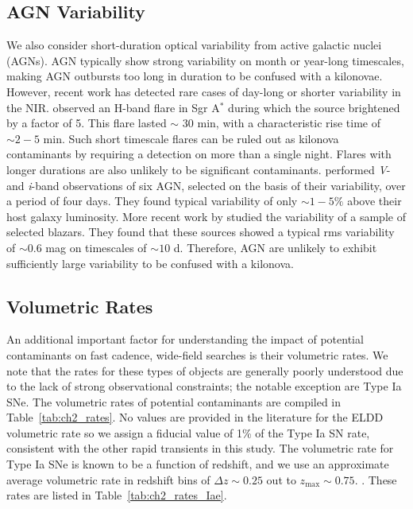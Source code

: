 \subsection{AGN Variability}
\label{sec:ch2_agns}
We also consider short-duration optical variability from active galactic nuclei (AGNs). AGN typically show strong variability on month or year-long timescales, making AGN outbursts too long in duration to be confused with a kilonovae. However, recent work has detected rare cases of day-long  or shorter variability in the NIR. \citet{Genzel+03} observed an H-band flare in Sgr A$^{*}$ during which the source brightened by a factor of 5. This flare lasted $\sim$ 30 min, with a characteristic rise time of $\sim2-5$ min. Such short timescale flares can be ruled out as kilonova contaminants by requiring a detection on more than a single night. Flares with longer durations are also unlikely to be significant contaminants. \citet{Totani+05} performed {\em V}- and {\em i}-band observations of six AGN, selected on the basis of their variability, over a period of four days. They found typical variability of only $\sim1-5\%$ above their host galaxy luminosity. More recent work by \citet{Ruan+12} studied the variability of a sample of \fermi selected blazars. They found that these sources showed a typical rms variability of $\sim0.6$ mag on timescales of $\sim 10$ d. Therefore, AGN are unlikely to exhibit sufficiently large variability to be confused with a kilonova.

\subsection{Volumetric Rates}
\label{sec:ch2_rates}
An additional important factor for understanding the impact of potential contaminants on fast cadence, wide-field searches is their volumetric rates. We note that the rates for these types of objects are generally poorly understood due to the lack of strong observational constraints; the notable exception are Type Ia SNe. The volumetric rates of potential contaminants are compiled in Table~\ref{tab:ch2_rates}. No values are provided in the literature for the ELDD volumetric rate so we assign a fiducial value of 1\% of the Type Ia SN rate, consistent with the other rapid transients in this study. The volumetric rate for Type Ia SNe is known to be a function of redshift, and we use an approximate average volumetric rate in redshift bins of $\Delta z \sim 0.25$ out to $z_{\text{max}} \sim 0.75$. \citep[][and references therein]{Li+11,Graur+14}. These rates are listed in Table~\ref{tab:ch2_rates_Iae}.


